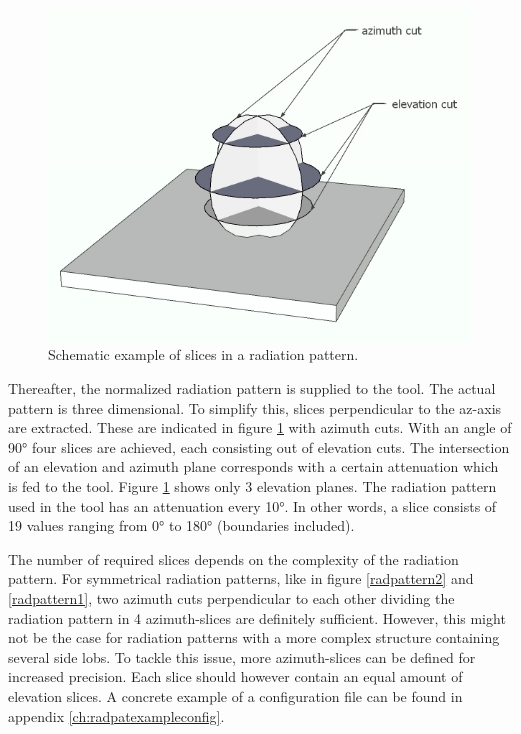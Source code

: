 \begin{figure}[H]
\centering
  \includegraphics[width=\textwidth/10*7]{../images/3Dimages/slicesOfPattern.jpg}
  \caption{Schematic example of slices in a radiation pattern.}
  \label{fig:slicesOfPattern}
\end{figure}

Thereafter, the normalized radiation pattern is supplied to the tool. The actual pattern is three dimensional. To simplify this,
slices perpendicular to the az-axis are extracted. These are indicated in figure \ref{fig:slicesOfPattern} with azimuth cuts. With
an angle of \ang{90} four slices are achieved, each consisting out of elevation cuts. The intersection of an elevation and azimuth plane 
corresponds with a certain attenuation which is fed to the tool. Figure \ref{fig:slicesOfPattern} shows only 3 elevation planes. The radiation pattern used in the tool 
has an attenuation every \ang{10}. In other words, a slice consists of 19 values ranging from \ang{0} to \ang{180} (boundaries included).

The number of required slices depends on the complexity of the radiation pattern. For symmetrical radiation patterns, like 
in figure \ref{radpattern2} and \ref{radpattern1}, two azimuth cuts perpendicular to each other dividing the radiation pattern in 4 azimuth-slices 
are definitely sufficient. However, this might not be the case for radiation patterns with a more complex structure containing several  
side lobs. To tackle this issue, more azimuth-slices can be defined for increased precision. Each slice should however contain an equal amount 
of elevation slices.  A concrete example of a configuration file can be found in appendix \ref{ch:radpatexampleconfig}.
 
